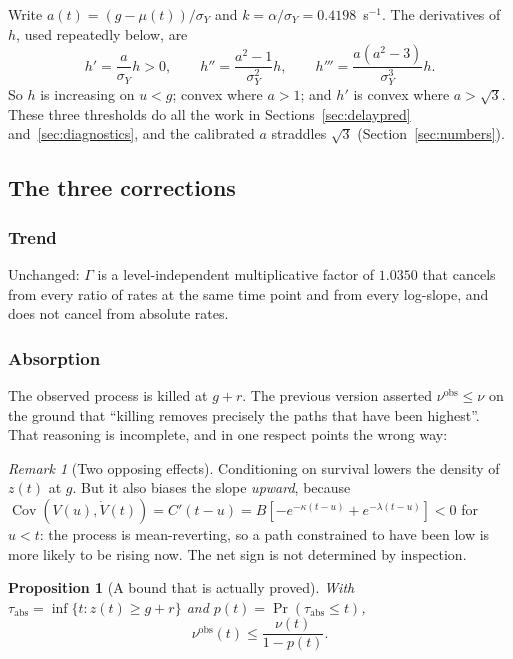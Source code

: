 \documentclass[11pt,a4paper]{article}
\newcommand{\Cov}{\operatorname{Cov}}
\theoremstyle{plain}
\newtheorem{proposition}{Proposition}
\theoremstyle{remark}
\newtheorem{remark}{Remark}
\begin{document}
Write $a(t)=(g-\mu(t))/\sigma_Y$ and $k=\alpha/\sigma_Y=0.4198$~s$^{-1}$. The derivatives
of $h$, used repeatedly below, are
\begin{equation}
h'=\frac{a}{\sigma_Y}h>0,\qquad
h''=\frac{a^2-1}{\sigma_Y^2}h,\qquad
h'''=\frac{a(a^2-3)}{\sigma_Y^{3}}h .
\label{eq:hderiv}
\end{equation}
So $h$ is increasing on $u<g$; convex where $a>1$; and $h'$ is convex where $a>\sqrt3$.
These three thresholds do all the work in Sections~\ref{sec:delaypred}
and~\ref{sec:diagnostics}, and the calibrated $a$ straddles $\sqrt3$
(Section~\ref{sec:numbers}).

\subsection{The three corrections}
\label{sec:corrections}

\subsubsection{Trend}
Unchanged: $\Gamma$ is a level-independent multiplicative factor of $1.0350$ that cancels
from every ratio of rates at the same time point and from every log-slope, and does not
cancel from absolute rates.

\subsubsection{Absorption}
The observed process is killed at $g+r$. The previous version asserted
$\nu^{\text{obs}}\le\nu$ on the ground that ``killing removes precisely the paths that have
been highest''. That reasoning is incomplete, and in one respect points the wrong way:

\begin{remark}[Two opposing effects]
Conditioning on survival lowers the density of $z(t)$ at $g$. But it also biases the slope
\emph{upward}, because $\Cov(V(u),\dot V(t))=C'(t-u)=B[-e^{-\kappa(t-u)}+e^{-\lambda(t-u)}]<0$
for $u<t$: the process is mean-reverting, so a path constrained to have been low is more
likely to be rising now. The net sign is not determined by inspection.
\end{remark}

\begin{proposition}[A bound that is actually proved]
\label{prop:absorb}
With $\tau_{\text{abs}}=\inf\{t:z(t)\ge g+r\}$ and $p(t)=\Pr(\tau_{\text{abs}}\le t)$,
\begin{equation}
\nu^{\text{obs}}(t)\le\frac{\nu(t)}{1-p(t)} .
\end{equation}
\end{proposition}
\end{document}
